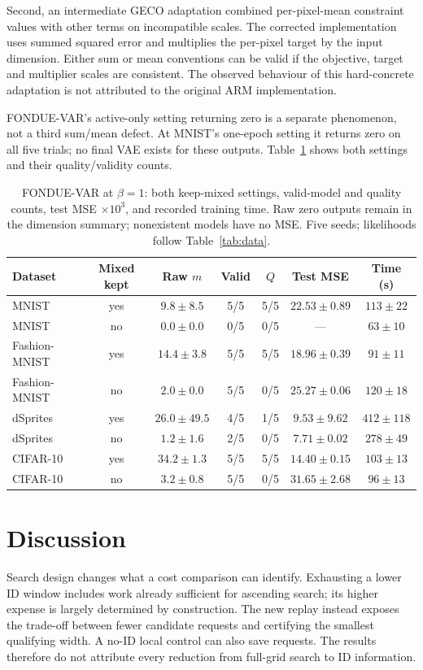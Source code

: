 \documentclass[make,article,submit,pdftex,moreauthors]{Definitions/mdpi}
\begin{document}
Second, an intermediate GECO adaptation combined per-pixel-mean
constraint values with other terms on incompatible scales. The corrected
implementation uses summed squared error and multiplies the per-pixel
target by the input dimension. Either sum or mean conventions can be
valid if the objective, target and multiplier scales are consistent.
The observed behaviour of this hard-concrete adaptation is not attributed
to the original ARM implementation.

FONDUE-VAR's active-only setting returning zero is a separate phenomenon,
not a third sum/mean defect. At MNIST's one-epoch setting it returns zero
on all five trials; no final VAE exists for these outputs.
Table~\ref{tab:var} shows both settings and their quality/validity counts.

\begin{table}[H]
\caption{FONDUE-VAR at $\beta=1$: both keep-mixed settings, valid-model and quality counts, test MSE $\times10^3$, and recorded training time. Raw zero outputs remain in the dimension summary; nonexistent models have no MSE. Five seeds; likelihoods follow Table~\ref{tab:data}.}\label{tab:var}
\footnotesize
\setlength{\tabcolsep}{3.5pt}
\begin{tabular*}{\textwidth}{@{\extracolsep{\fill}}lcccccc@{}}
\toprule
Dataset & Mixed kept & Raw $m$ & Valid & $Q$ & Test MSE & Time (s) \\
\midrule
MNIST & yes & $9.8 \pm 8.5$ & 5/5 & 5/5 & $22.53 \pm 0.89$ & $113 \pm 22$ \\
MNIST & no & $0.0 \pm 0.0$ & 0/5 & 0/5 & --- & $63 \pm 10$ \\
Fashion-MNIST & yes & $14.4 \pm 3.8$ & 5/5 & 5/5 & $18.96 \pm 0.39$ & $91 \pm 11$ \\
Fashion-MNIST & no & $2.0 \pm 0.0$ & 5/5 & 0/5 & $25.27 \pm 0.06$ & $120 \pm 18$ \\
dSprites & yes & $26.0 \pm 49.5$ & 4/5 & 1/5 & $9.53 \pm 9.62$ & $412 \pm 118$ \\
dSprites & no & $1.2 \pm 1.6$ & 2/5 & 0/5 & $7.71 \pm 0.02$ & $278 \pm 49$ \\
CIFAR-10 & yes & $34.2 \pm 1.3$ & 5/5 & 5/5 & $14.40 \pm 0.15$ & $103 \pm 13$ \\
CIFAR-10 & no & $3.2 \pm 0.8$ & 5/5 & 0/5 & $31.65 \pm 2.68$ & $96 \pm 13$ \\
\bottomrule
\end{tabular*}
\end{table}


\section{Discussion}\label{sec:discussion}
Search design changes what a cost comparison can identify. Exhausting
a lower ID window includes work already sufficient for ascending search;
its higher expense is largely determined by construction. The new replay
instead exposes the trade-off between fewer candidate requests and
certifying the smallest qualifying width. A no-ID local control can also
save requests. The results therefore do not attribute every reduction
from full-grid search to ID information.
\end{document}
